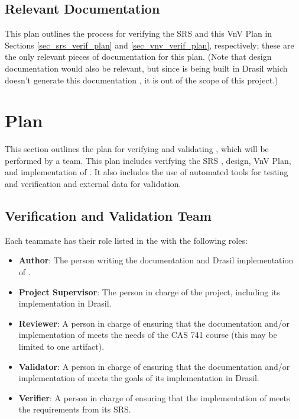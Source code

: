 \documentclass[12pt, titlepage]{article}
\begin{document}
\subsection{Relevant Documentation}

This plan outlines the process for verifying the SRS \cite{srs} and this
VnV Plan in Sections \ref{sec_srs_verif_plan} and \ref{sec_vnv_verif_plan},
respectively; these are the only relevant pieces of documentation for this
plan. (Note that design documentation would also be relevant, but since
\progname{} is being built in Drasil which doesn't generate this documentation
\cite{carette_drasil_2021}, it is out of the scope of this project.)

\section{Plan} \label{sec_plan}

This section outlines the plan for verifying and validating \progname{}, which
will be performed by a team. This plan includes verifying the SRS \cite{srs},
design, VnV Plan, and implementation of \progname{}. It also includes the use
of automated tools for testing and verification and external data for
validation.

\subsection{Verification and Validation Team} \label{sec_vnv_team}

Each teammate has their role listed in the  with the
following roles:

\begin{itemize}
  \item \textbf{Author}: The person writing the documentation and Drasil
        implementation of \progname{}.

  \item \textbf{Project Supervisor}: The person in charge of the \progname{}
        project, including its implementation in Drasil.

  \item \textbf{Reviewer}: A person in charge of ensuring that the
        documentation and/or implementation of \progname{} meets the needs of
        the CAS 741 course (this may be limited to one artifact).

  \item \textbf{Validator}: A person in charge of ensuring that the
        documentation and/or implementation of \progname{} meets the goals of
        its implementation in Drasil.

  \item \textbf{Verifier}: A person in charge of ensuring that the
        implementation of \progname{} meets the requirements from its SRS.

\end{itemize}
\end{document}
